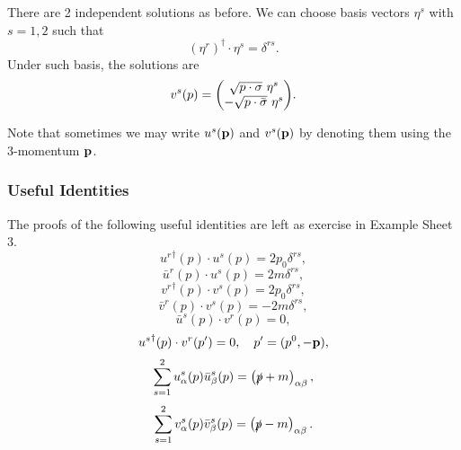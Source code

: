 \documentclass[a4paper,11pt]{article}
\begin{document}
	There are 2 independent solutions as before. We can choose basis vectors $\eta^s$ with $s = 1,2$ such that 
	\[
		(\eta^r)^{\dagger}\cdot \eta^s = \delta ^{rs}.
	\]
	Under such basis, the solutions are 
	\[
		v^s(p) = \mqty(\sqrt{p \cdot \sigma}\ \eta^s\\- \sqrt{p \cdot \bar \sigma}\ \eta^s).
	\]
	
	Note that sometimes we may write $u^s(\vb p)$ and $v^s(\vb p)$ by denoting them using the 3-momentum $\vb p$.
	
	\subsubsection{Useful Identities}

	The proofs of the following useful identities are left as exercise in Example Sheet 3.
	$${u^r}^{\dagger}(p) \cdot u^s(p) = 2p_0 \delta ^{rs},$$
	$$\bar u^r(p) \cdot u^s(p) = 2m \delta ^{rs},$$
	\[
		{v^r}^{\dagger}(p) \cdot v^s(p) = 2 p_0 \delta ^{rs},
	\]
	\[
		\bar v^r (p) \cdot v^s(p) = - 2 m \delta ^{rs},
	\]
	\[
		\bar u^s (p) \cdot v^r(p) = 0,
	\]
	\[
		{u^s}^{\dagger}(p) \cdot v^r(p') = 0, \quad p' = (p^0, - \vb p),
	\]
	\[
		\sum _{s=1}^{2} u^s_\alpha(p) \bar u^s_\beta(p) = \left( \slashed{p} + m \right)_{\alpha \beta},
	\]
	\[
		\sum _{s = 1}^2 v_\alpha^s(p)\bar v_\beta^s(p) = \left( \slashed{p} - m \right) _{\alpha \beta}.
	\]
	


	

	
	
	
	
	
	
	  
\end{document}
